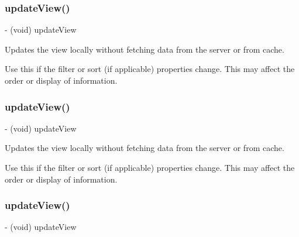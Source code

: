 \subsubsection{\texorpdfstring{update\+View()}{updateView()}\hspace{0.1cm}{\footnotesize\ttfamily [1/5]}}
{\footnotesize\ttfamily -\/ (void) update\+View \begin{DoxyParamCaption}{ }\end{DoxyParamCaption}}

Updates the view locally without fetching data from the server or from cache.

Use this if the filter or sort (if applicable) properties change. This may affect the order or display of information. \mbox{\label{interfaceFBGraphObjectPickerViewController_a4553f2ebea1891b75c18551c7a9cefc5}} 
\subsubsection{\texorpdfstring{update\+View()}{updateView()}\hspace{0.1cm}{\footnotesize\ttfamily [2/5]}}
{\footnotesize\ttfamily -\/ (void) update\+View \begin{DoxyParamCaption}{ }\end{DoxyParamCaption}}

Updates the view locally without fetching data from the server or from cache.

Use this if the filter or sort (if applicable) properties change. This may affect the order or display of information. \mbox{\label{interfaceFBGraphObjectPickerViewController_a4553f2ebea1891b75c18551c7a9cefc5}} 
\subsubsection{\texorpdfstring{update\+View()}{updateView()}\hspace{0.1cm}{\footnotesize\ttfamily [3/5]}}
{\footnotesize\ttfamily -\/ (void) update\+View \begin{DoxyParamCaption}{ }\end{DoxyParamCaption}}

